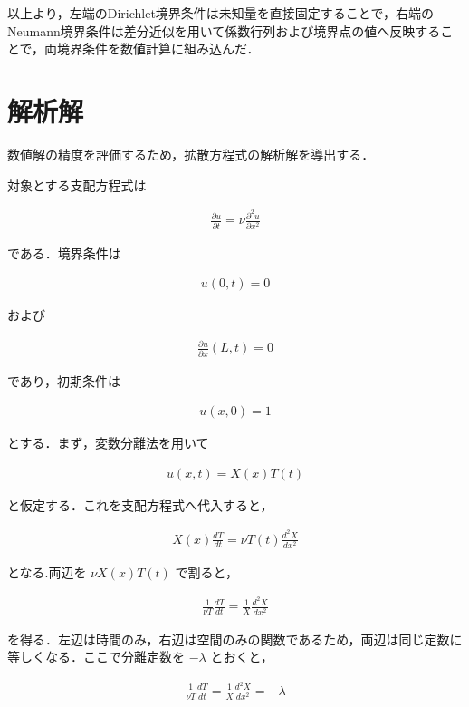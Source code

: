 \documentclass[dvipdfmx]{jsarticle}
\begin{document}
以上より，左端のDirichlet境界条件は未知量を直接固定することで，右端のNeumann境界条件は差分近似を用いて係数行列および境界点の値へ反映することで，両境界条件を数値計算に組み込んだ．

\section{解析解}

数値解の精度を評価するため，拡散方程式の解析解を導出する．

対象とする支配方程式は

\begin{align}
\frac{\partial u}{\partial t}
=
\nu
\frac{\partial^2u}{\partial x^2}
\end{align}

である．境界条件は

\begin{align}
u(0,t)=0
\end{align}

および

\begin{align}
\frac{\partial u}{\partial x}(L,t)=0
\end{align}

であり，初期条件は

\begin{align}
u(x,0)=1
\end{align}

とする．まず，変数分離法を用いて

\begin{align}
u(x,t)=X(x)T(t)
\end{align}

と仮定する．これを支配方程式へ代入すると，

\begin{align}
X(x)\frac{dT}{dt}
=
\nu
T(t)\frac{d^2X}{dx^2}
\end{align}

となる.両辺を $\nu X(x)T(t)$ で割ると，

\begin{align}
\frac{1}{\nu T}
\frac{dT}{dt}
=
\frac{1}{X}
\frac{d^2X}{dx^2}
\end{align}

を得る．左辺は時間のみ，右辺は空間のみの関数であるため，両辺は同じ定数に等しくなる．ここで分離定数を $-\lambda$ とおくと，

\begin{align}
\frac{1}{\nu T}
\frac{dT}{dt}
=
\frac{1}{X}
\frac{d^2X}{dx^2}
=
-\lambda
\end{align}
\end{document}
